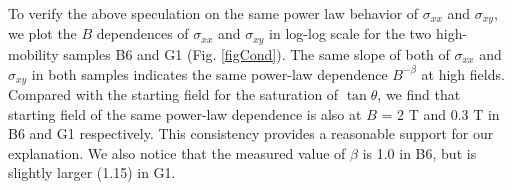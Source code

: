To verify the above speculation on the same power law behavior of $\sigma_{xx}$ and $\sigma_{xy}$, we plot the $B$ dependences of $\sigma_{xx}$ and $\sigma_{xy}$ in log-log scale for the two high-mobility samples B6 and G1 (Fig. \ref{figCond}). The same slope of both of $\sigma_{xx}$ and $\sigma_{xy}$ in both samples indicates the same power-law dependence $B^{-\beta}$ at high fields. Compared with the starting field for the saturation of $\tan\theta$, we find that starting field of the same power-law dependence is also at $B$ = 2 T and 0.3 T in B6 and G1 respectively. This consistency provides a reasonable support for our explanation. We also notice that the measured value of $\beta$ is 1.0 in B6, but is slightly larger (1.15) in G1. 










%

















\hfill \break

